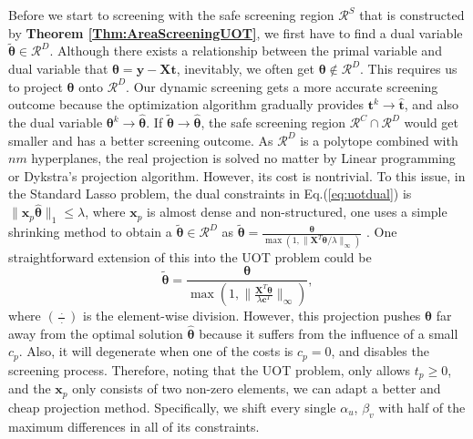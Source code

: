 \documentclass[twoside]{article}
\theoremstyle{plain}
\newcommand{\mat}[1]{\mathbf{#1}}
\renewcommand{\vec}[1]{\bm{#1}}
\begin{document}
Before we start to screening with the safe screening region $\mathcal{R}^S$ that is constructed by {\bf Theorem \ref{Thm:AreaScreeningUOT}}, we first have to find a dual variable $\tilde{\vec{\theta}}\in\mathcal{R}^{D}$. Although there exists a relationship between the primal variable and dual variable that $\vec{\theta} = \vec{y} - \mat{X}\vec{t}$, inevitably, we often get $\vec{\theta} \notin \mathcal{R}^{D}$. This requires us to project $\vec{\theta}$ onto $\mathcal{R}^{D}$. Our dynamic screening gets a more accurate screening outcome because the optimization algorithm gradually provides $\vec t^{k} \rightarrow \hat{\vec t}$, and also the dual variable $\vec \theta^{k} \rightarrow \hat{\vec \theta}$. If $\vec{ \tilde{\theta}}\rightarrow \hat{\vec \theta}$, the safe screening region $\mathcal{R}^{C}\cap\mathcal{R}^{D}$ would get smaller and has a better screening outcome. As $\mathcal{R}^{D}$ is a polytope combined with $nm$ hyperplanes, the real projection is solved no matter by Linear programming or Dykstra's projection algorithm. However, its cost is nontrivial. To this issue, in the Standard Lasso problem, the dual constraints in {Eq.(\ref{eq:uotdual})} is $\|\vec{x}_p \hat{\vec{\theta}}\|_1\leq \lambda$, where $\vec{x}_p$ is almost dense and non-structured, one uses a simple shrinking method to obtain a $\tilde{\vec{\theta}} \in \mathcal{R}^{D}$ as 
$
\tilde{\vec{\theta}} = \frac{\vec\theta}{\max(1, \|{\mat{X}^T\vec\theta}/{\lambda}\|_{\infty})}
$ {\citep[Theorem 11]{Yamada_NIPS_2021}}. 
One straightforward extension of this into the UOT problem could be  
\begin{equation*}
\tilde{\vec{\theta}} = \frac{\vec\theta}{\max(1, \|\frac{\mat{X}^T\vec\theta}{\lambda \vec{c}^{T}}\|_{\infty})}, 
\end{equation*}
where $(\frac{\ \cdot\ }{\cdot})$ is the element-wise division. However, this projection pushes $\vec{\theta}$ far away from the optimal solution $\hat{\vec{\theta}}$ because it suffers from the influence of a small $c_p$. Also, it will degenerate when one of the costs is $c_p = 0$, and disables the screening process. 
%
Therefore, noting that the UOT problem, only allows $t_p \geq 0$, and the $\vec{x}_p$ only consists of two non-zero elements, we can adapt a better and cheap projection method. Specifically, we shift every single $\alpha_u$, $\beta_v$ with half of the maximum differences in all of its constraints.
%
\end{document}
